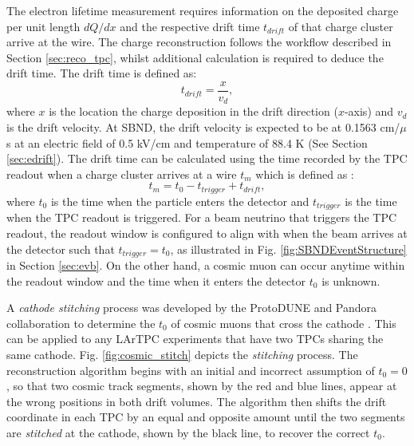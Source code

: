 The electron lifetime measurement requires information on the deposited charge per unit length $dQ/dx$ and the respective drift time $t_{drift}$ of that charge cluster arrive at the wire.
The charge reconstruction follows the workflow described in Section \ref{sec:reco_tpc}, whilst additional calculation is required to deduce the drift time.     
The drift time is defined as:
\begin{equation}
        t_{drift} = \frac{x}{v_{d}},
\end{equation}
where $x$ is the location the charge deposition in the drift direction ($x$-axis) and $v_{d}$ is the drift velocity.
At SBND, the drift velocity is expected to be at 0.1563 cm/$\mu$s at an electric field of 0.5 kV/cm and temperature of 88.4 K (See Section \ref{sec:edrift}).
The drift time can be calculated using the time recorded by the TPC readout when a charge cluster arrives at a wire $t_{m}$ which is defined as \cite{pandora_protodune}:
\begin{equation}
\label{eq:t0}
        t_{m} = t_{0} - t_{trigger} + t_{drift},
\end{equation}
where $t_{0}$ is the time when the particle enters the detector and $t_{trigger}$ is the time when the TPC readout is triggered.
For a beam neutrino that triggers the TPC readout, the readout window is configured to align with when the beam arrives at the detector such that $t_{trigger} = t_{0}$, as illustrated in Fig. \ref{fig:SBNDEventStructure} in Section \ref{sec:evb}.
On the other hand, a cosmic muon can occur anytime within the readout window and the time when it enters the detector $t_{0}$ is unknown.

A \textit{cathode stitching} process was developed by the ProtoDUNE and Pandora collaboration to determine the $t_{0}$ of cosmic muons that cross the cathode \cite{pandora_protodune}.
This can be applied to any LArTPC experiments that have two TPCs sharing the same cathode.
Fig. \ref{fig:cosmic_stitch} depicts the \textit{stitching} process.
The reconstruction algorithm begins with an initial and incorrect assumption of $t_{0} = 0$, so that two cosmic track segments, shown by the red and blue lines, appear at the wrong positions in both drift volumes.
The algorithm then shifts the drift coordinate in each TPC by an equal and opposite amount until the two segments are \textit{stitched} at the cathode, shown by the black line, to recover the correct $t_{0}$.

